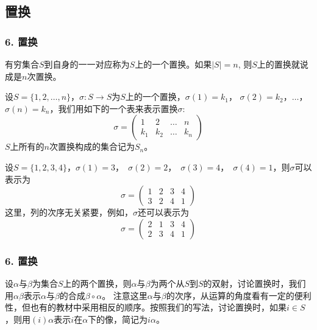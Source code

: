 \documentclass{beamer}
\begin{document}
\begin{CJK*}{UTF8}{gbsn}
\section{置换}
\begin{frame}
  \frametitle{6. 置换}
  \begin{Def}
    有穷集合$S$到自身的一一对应称为$S$上的一个\alert{置换}。如果$|S| = n$, 则$S$上的置换就说成是\alert{$n$次置换}。
  \end{Def}
\justifying\let\raggedright\justifying
设$S=\{1,2,\ldots,n\}$，$\sigma:S\to S$为$S$上的一个置换，$\sigma(1) = k_1$， $\sigma(2) = k_2$，$\ldots$，$\sigma(n) = k_n$，我们用如下的一个表来表示置换$\sigma$:
\[\sigma=\begin{pmatrix}1&2&\ldots&n\\k_1&k_2&\ldots&k_n\end{pmatrix}\]
$S$上所有的$n$次置换构成的集合记为$S_n$。
\small{\begin{Ex}
  设$S=\{1,2,3,4\}$，$\sigma(1) = 3$，　$\sigma(2) = 2$，　$\sigma(3) = 4$，　$\sigma(4) = 1$，则$\sigma$可以表示为
  \[\sigma=\begin{pmatrix}1&2&3&4\\3&2&4&1\end{pmatrix}\]
  这里，列的次序无关紧要，例如，$\sigma$还可以表示为
  \[\sigma=\begin{pmatrix}2&1&3&4\\2&3&4&1\end{pmatrix}\]
\end{Ex}}
\end{frame}
\begin{frame}
  \frametitle{6. 置换} 
  \begin{Def}
    设$\alpha$与$\beta$为集合$S$上的两个置换，则$\alpha$与$\beta$为两个从$S$到$S$的双射，讨论置换时，我们用$\alpha\beta$表示$\alpha$与$\beta$的合成$\beta \circ \alpha$。
    注意这里$\alpha$与$\beta$的次序，从运算的角度看有一定的便利性，但也有的教材中采用相反的顺序。按照我们的写法，讨论置换时，如果$i \in S$，则用$(i)\alpha$表示$i$在$\alpha$下的像，简记为$i\alpha$。
  \end{Def}
 \end{frame}


\end{CJK*}
\end{document}
